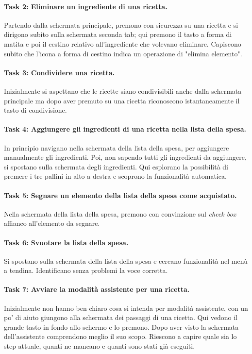 \paragraph{Task 2: Eliminare un ingrediente di una ricetta.}
Partendo dalla schermata principale, premono con sicurezza su una ricetta e si dirigono subito sulla schermata seconda tab; qui premono il tasto a forma di matita e poi il cestino relativo all'ingrediente che volevano eliminare.
Capiscono subito che l'icona a forma di cestino indica un operazione di "elimina elemento".

\paragraph{Task 3: Condividere una ricetta.}
Inizialmente si aspettano che le ricette siano condivisibili anche dalla schermata principale ma dopo aver premuto su una ricetta riconoscono istantaneamente il tasto di condivisione.

\paragraph{Task 4: Aggiungere gli ingredienti di una ricetta nella lista della spesa.}
In principio navigano nella schermata della lista della spesa, per aggiungere manualmente gli ingredienti.
Poi, non sapendo tutti gli ingredienti da aggiungere, si spostano sulla schermata degli ingredienti.
Qui esplorano la possibilità di premere i tre pallini in alto a destra e scoprono la funzionalità automatica.

\paragraph{Task 5: Segnare un elemento della lista della spesa come acquistato.}
Nella schermata della lista della spesa, premono con convinzione sul \textit{check box} affianco all'elemento da segnare.

\paragraph{Task 6: Svuotare la lista della spesa.}
Si spostano sulla schermata della lista della spesa e cercano funzionalità nel menù a tendina.
Identificano senza problemi la voce corretta.

\paragraph{Task 7: Avviare la modalità assistente per una ricetta.}
Inizialmente non hanno ben chiaro cosa si intenda per modalità assistente, con un po' di aiuto giungono alla schermata dei passaggi di una ricetta.
Qui vedono il grande tasto in fondo allo schermo e lo premono.
Dopo aver visto la schermata dell'assistente comprendono meglio il suo scopo.
Riescono a capire quale sia lo step attuale, quanti ne mancano e quanti sono stati già eseguiti.

